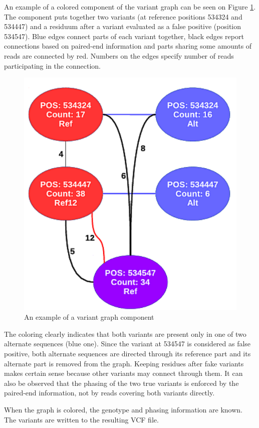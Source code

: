 An example of a colored component of the variant graph can be seen on Figure \ref{fig:variant-graph}. The component puts together two variants (at reference positions 534324 and 534447) and a residuum after a variant evaluated as a false positive (position 534547). Blue edges connect parts of each variant together, black edges report connections based on paired-end information and parts sharing some amounts of reads are connected by red. Numbers on the edges specify number of reads participating in the connection. 

\begin{figure}[h]
	\centering
	\includegraphics{img/variant-graph.pdf}
	\caption{An example of a variant graph component}
	\label{fig:variant-graph}
\end{figure}

The coloring clearly indicates that both variants are present only in one of two alternate sequences (blue one). Since the variant at 534547 is considered as false positive, both alternate sequences are directed through its reference part and its alternate part is removed from the graph. Keeping residues after fake variants makes certain sense because other variants may connect through them. It can also be observed that the phasing of the two true variants is enforced by the paired-end information, not by reads covering both variants directly.

When the graph is colored, the genotype and phasing information are known. The variants are written to the resulting VCF file.
